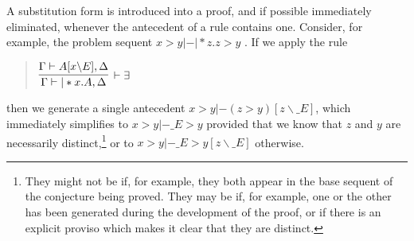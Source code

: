 A substitution form is introduced into a proof, and if possible immediately eliminated, whenever the antecedent of a rule contains one. Consider, for example, the problem sequent $x>y |-|*z.z>y$ . If we apply the rule
\begin{quote}
$\infer[|-\exists] {\Gamma|-|*x.A,\Delta} {\Gamma|-A[x\backslash E],\Delta}$
\end{quote}
then we generate a single antecedent $x>y |- (z>y)[z\backslash \_E]$, which immediately simplifies to $x>y |- \_E>y$ provided that we know that $z$ and $y$ are necessarily distinct,\footnote{They might not be if, for example, they both appear in the base sequent of the conjecture being proved. They may be if, for example, one or the other has been generated during the development of the proof, or if there is an explicit proviso which makes it clear that they are distinct.} or to $x>y |- \_E>y[z\backslash \_E]$ otherwise.

